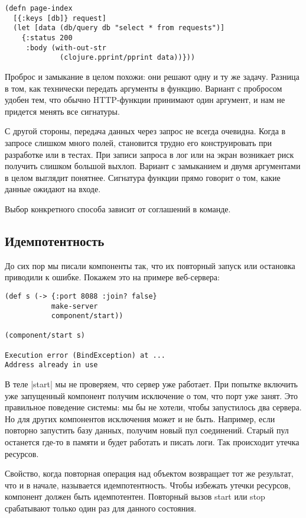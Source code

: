 \begin{verbatim}
(defn page-index
  [{:keys [db]} request]
  (let [data (db/query db "select * from requests")]
    {:status 200
     :body (with-out-str
             (clojure.pprint/pprint data))}))
\end{verbatim}

Проброс и замыкание в целом похожи: они решают одну и ту же задачу. Разница в
том, как технически передать аргументы в функцию. Вариант с пробросом удобен
тем, что обычно HTTP-функции принимают один аргумент, и нам не придется менять
все сигнатуры.

С другой стороны, передача данных через запрос не всегда очевидна. Когда в
запросе слишком много полей, становится трудно его конструировать при разработке
или в тестах. При записи запроса в лог или на экран возникает риск получить
слишком большой выхлоп. Вариант с замыканием и двумя аргументами в целом
выглядит понятнее. Сигнатура функции прямо говорит о том, какие данные ожидают
на входе.

Выбор конкретного способа зависит от соглашений в команде.

\subsection{Идемпотентность}

До сих пор мы писали компоненты так, что их повторный запуск или остановка
приводили к ошибке. Покажем это на примере веб-сервера:

\begin{verbatim}
(def s (-> {:port 8088 :join? false}
           make-server
           component/start))

(component/start s)

Execution error (BindException) at ...
Address already in use
\end{verbatim}


В теле \spverb|start| мы не проверяем, что сервер уже работает. При попытке включить
уже запущенный компонент получим исключение о том, что порт уже занят. Это
правильное поведение системы: мы бы не хотели, чтобы запустилось два сервера. Но
для других компонентов исключения может и не быть. Например, если повторно
запустить базу данных, получим новый пул соединений. Старый пул останется где-то
в памяти и будет работать и писать логи. Так происходит утечка ресурсов.

Свойство, когда повторная операция над объектом возвращает тот же результат, что
и в начале, называется идемпотентность. Чтобы избежать утечки ресурсов,
компонент должен быть идемпотентен. Повторный вызов start или stop срабатывают
только один раз для данного состояния.

